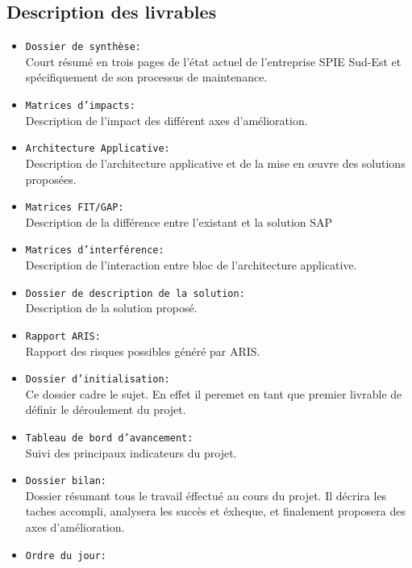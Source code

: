 \documentclass[]{scrartcl}
\begin{document}
\subsection{Description des livrables}
\begin{itemize}
\item  \texttt{Dossier de synthèse:}\\ Court résumé en trois pages de l'état actuel de l'entreprise SPIE Sud-Est et spécifiquement de son processus de maintenance.
\item  \texttt{Matrices d'impacts:}\\ Description de l'impact des différent axes d'amélioration.
\item  \texttt{Architecture Applicative:}\\ Description de l'architecture applicative et de la mise en œuvre des solutions proposées. 
\item  \texttt{Matrices FIT/GAP:}\\ Description de la différence entre l'existant et la solution SAP
\item \texttt{Matrices d'interférence:}\\ Description de l'interaction entre bloc de l'architecture applicative. 
\item  \texttt{Dossier de description de la solution:}\\ Description de la solution proposé. 
\item  \texttt{Rapport ARIS:}\\  Rapport des risques possibles généré par ARIS.
\\
\item  \texttt{Dossier d'initialisation:}\\ Ce dossier cadre le sujet. En effet il peremet en tant que premier livrable de définir le déroulement du projet. 
\item  \texttt{Tableau de bord d'avancement:} \\ Suivi des principaux indicateurs du projet.
\item  \texttt{Dossier bilan:}\\ Dossier résumant tous le travail éffectué au cours du projet. Il décrira les taches accompli, analysera les succès et éxheque, et finalement proposera des axes d'amélioration.
\item \texttt{Ordre du jour:} \\
\end{itemize}
\end{document}
